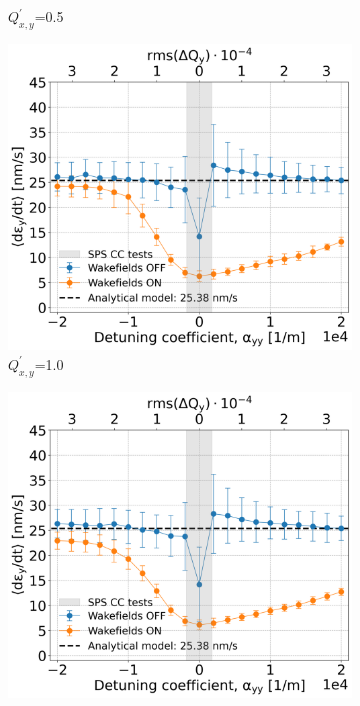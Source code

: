 \begin{figure}[htp]
\begin{subfigure}{.45\textwidth}
        \caption{$Q^\prime_{x,y}$=0.5}
        \label{fig:study_6_chroma_scan_Qpxy5e-1}
    \end{subfigure}
    \begin{subfigure}{.45\textwidth}
        \centering
        \includegraphics[width=.95\linewidth]{images/Ch7/Qpx1.png}  
        \caption{$Q^\prime_{x,y}$=1.0}
        \label{fig:study_6_chroma_scan_Qpxy1}
    \end{subfigure}
    \begin{subfigure}{.45\textwidth}
        \centering
        \includegraphics[width=.95\linewidth]{images/Ch7/Qpx25e-1.png}  

\end{subfigure}
\end{figure}
